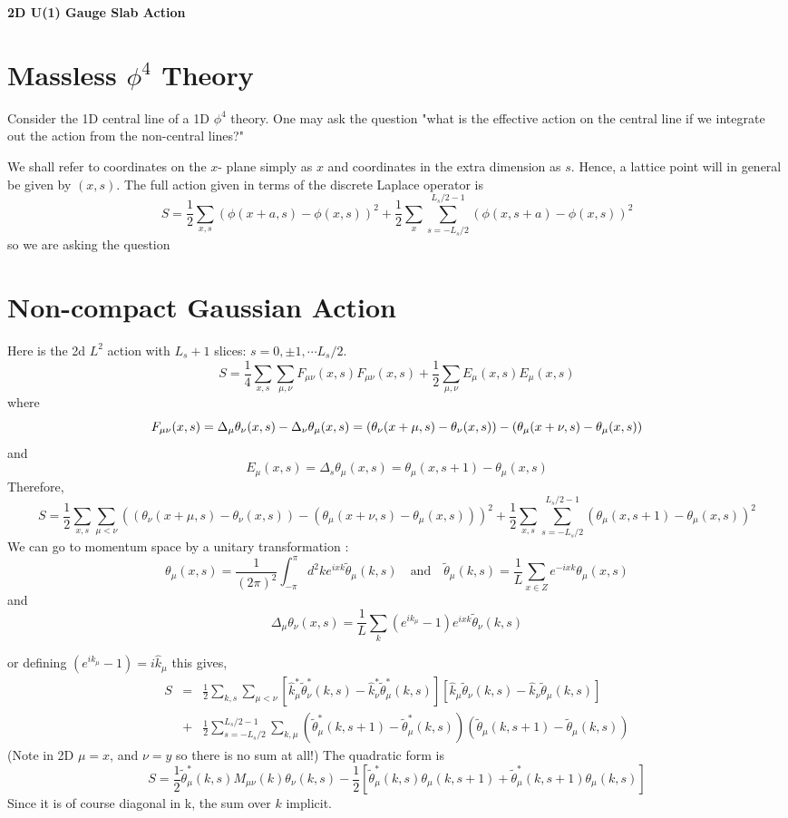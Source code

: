 \documentclass[12 pt]{article}
\newcommand{\nn}{\nonumber \\}
\newcommand\be{\begin{equation}}
\newcommand\ee{\end{equation}}
\newcommand\bea{\begin{eqnarray}}
\newcommand\eea{\end{eqnarray}}
\newcommand{\<}{\langle}
\renewcommand{\>}{\rangle}
\begin{document}
\begin{center}
 \Large \bf 2D U(1) Gauge Slab Action
\end{center}

\section{Massless $\phi^4$ Theory}
Consider the 1D central line of a 1D $\phi^4$ theory. One may ask the question "what is the effective action on the central line if we integrate out the action from the non-central lines?"

We shall refer to coordinates on the $x$- plane simply as $x$ and coordinates in the extra dimension as $s$. Hence, a lattice point will in general be given by $(x,s)$. The full action given in terms of the discrete Laplace operator is
\be
S =  \frac{1}{2} \sum_{x,s} (\phi(x+a,s) - \phi(x,s))^2 + \frac{1}{2}\sum_{x}\sum_{s=-L_{s}/2}^{L_s/2-1}(\phi(x,s+a) - \phi(x,s))^2
\ee
so we are asking the question 



\section{Non-compact Gaussian Action}

Here is the 2d $L^2$ action  with $L_s + 1$  slices: $s = 0, \pm 1, \cdots L_s/2$.
%
\be
S =  \frac{1}{4} \sum_{x,s}   \sum_{\mu,\nu} F_{\mu \nu}(x,s) F_{\mu
  \nu}(x,s)  + \frac{1}{2} \sum_{\mu,\nu} E_\mu(x,s) E_\mu(x,s)  
\ee
where 
\be
F_{\mu \nu}(x,s)  = \Delta_\mu \theta_\nu(x,s) - \Delta_\nu \theta_\mu(x,s) \nn
 = ( \theta_\nu(x +\mu,s) - \theta_\nu(x,s) ) - ( \theta_\mu(x +\nu,s) - \theta_\mu(x,s) )
\ee
and 
\be
E_\mu(x,s) = \Delta_s \theta_\mu(x,s) = \theta_\mu(x,s+1)  -\theta_\mu(x,s) 
\ee
Therefore,
\be
S =  \frac{1}{2} \sum_{x,s}  \sum_{\mu <\nu} ( ( \theta_\nu(x +\mu,s)
- \theta_\nu(x,s) ) - ( \theta_\mu(x +\nu,s) - \theta_\mu(x,s) ))^2
+ \frac{1}{2} \sum_{x,s} \sum^{L_s/2 -1}_{s= -L_s/2} (\theta_\mu(x,s+1)  -\theta_\mu(x,s) )^2
\ee
We can go to momentum space by a unitary transformation :
\be
\theta_\mu(x,s) =  \frac{1}{(2 \pi)^2}\int^\pi_{-\pi} d^2k   e^{i x k}\widetilde\theta_\mu(k,s) \quad 
\mbox{and} \quad  \widetilde \theta_\mu(k,s) = \frac{1}{L}\sum_{x \in Z}  e^{-i x k} \theta_\mu(x,s) 
\ee
and 
\be
\Delta_\mu \theta_\nu(x,s)
= \frac{1}{L}\sum_k(e^{ik_\mu} - 1)  e^{i x k} \widetilde
\theta_\nu(k,s) 
\ee

or defining $ (e^{ik_\mu} - 1) =  i \hat k_\mu $ this  gives,
\bea
S &=&  \frac{1}{2} \sum_{k,s}\sum_{\mu <\nu} [ \hat k^*_\mu  \widetilde \theta^*_\nu(k,s) -
\hat k^*_\nu   \widetilde \theta^*_\mu(k,s) ]  [ \hat k_\mu  \widetilde \theta_\nu(k,s) -
\hat k_\nu   \widetilde \theta_\mu(k,s) ]  \nn
&+& \frac{1}{2} \sum^{L_s/2 -1}_{s= -L_s/2}  \sum_{k,\mu} (\widetilde\theta^*_\mu(k,s+1) -\widetilde\theta^*_\mu(k,s))(\widetilde\theta_\mu(k,s+1)  -\widetilde\theta_\mu(k,s) )
\eea
(Note in 2D  $\mu = x$, and $\nu = y$ so there is no sum at all!) 
The quadratic form is 
\be
S = \frac{1}{2} \widetilde \theta^*_\mu(k,s)
M_{\mu\nu}(k)\theta_\nu(k,s)  - \frac{1}{2} [\widetilde
\theta^*_\mu(k,s) \theta_\mu(k,s+1) + \widetilde
\theta^*_\mu(k,s+1) \theta_\mu(k,s)]
\ee
Since it is of course diagonal in k, the sum over $k$ implicit. 
\end{document}
